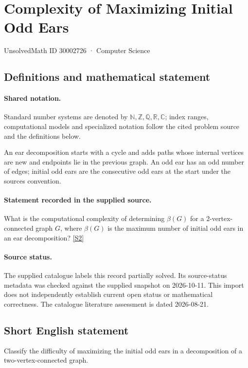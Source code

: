 \documentclass[11pt]{article}
\newcommand{\sref}[2]{\hyperlink{source:#1:#2}{[S#2]}}
\begin{document}
\setcounter{section}{30002725}
\section{Complexity of Maximizing Initial Odd Ears}\label{30002726}
{\small\sffamily UnsolvedMath ID 30002726 · Computer Science}
\subsection{Definitions and mathematical statement}

\paragraph{Shared notation.}Standard number systems are denoted by $\mathbb N,\mathbb Z,\mathbb Q,\mathbb R,\mathbb C$; index ranges, computational models and specialized notation follow the cited problem source and the definitions below.


An ear decomposition starts with a cycle and adds paths whose internal vertices are new and endpoints lie in the previous graph. An odd ear has an odd number of edges; initial odd ears are the consecutive odd ears at the start under the source\textquotesingle s convention.
\paragraph{Statement recorded in the supplied source.}
What is the computational complexity of determining $\beta(G)$ for a $2$-vertex-connected graph $G$, where $\beta(G)$ is the maximum number of initial odd ears in an ear decomposition? \sref{30002726}{2}
\paragraph{Source status.}
The supplied catalogue labels this record partially solved. Its source-status metadata was checked against the supplied snapshot on 2026-10-11. This import does not independently establish current open status or mathematical correctness. The catalogue literature assessment is dated 2026-08-21.
\subsection{Short English statement}
Classify the difficulty of maximizing the initial odd ears in a decomposition of a two-vertex-connected graph.
\end{document}
